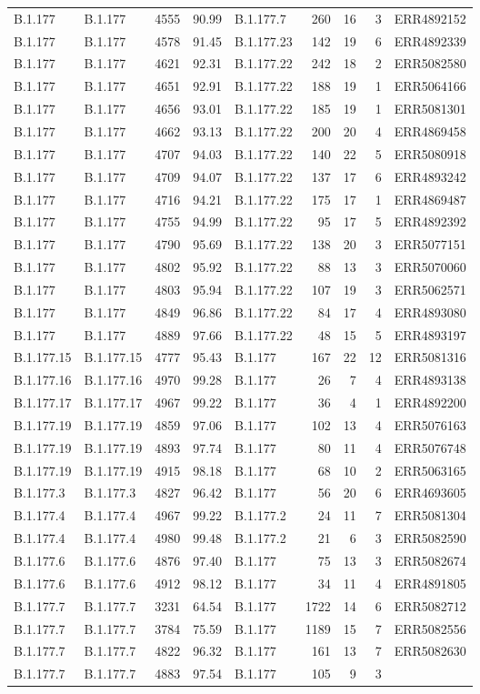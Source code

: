 \documentclass[
]{article}
\begin{document}
\begin{longtable}[]{@{}llrrlrrrl@{}}
B.1.177 & B.1.177 & 4555 & 90.99 & B.1.177.7 & 260 & 16 & 3 &
ERR4892152\tabularnewline
B.1.177 & B.1.177 & 4578 & 91.45 & B.1.177.23 & 142 & 19 & 6 &
ERR4892339\tabularnewline
B.1.177 & B.1.177 & 4621 & 92.31 & B.1.177.22 & 242 & 18 & 2 &
ERR5082580\tabularnewline
B.1.177 & B.1.177 & 4651 & 92.91 & B.1.177.22 & 188 & 19 & 1 &
ERR5064166\tabularnewline
B.1.177 & B.1.177 & 4656 & 93.01 & B.1.177.22 & 185 & 19 & 1 &
ERR5081301\tabularnewline
B.1.177 & B.1.177 & 4662 & 93.13 & B.1.177.22 & 200 & 20 & 4 &
ERR4869458\tabularnewline
B.1.177 & B.1.177 & 4707 & 94.03 & B.1.177.22 & 140 & 22 & 5 &
ERR5080918\tabularnewline
B.1.177 & B.1.177 & 4709 & 94.07 & B.1.177.22 & 137 & 17 & 6 &
ERR4893242\tabularnewline
B.1.177 & B.1.177 & 4716 & 94.21 & B.1.177.22 & 175 & 17 & 1 &
ERR4869487\tabularnewline
B.1.177 & B.1.177 & 4755 & 94.99 & B.1.177.22 & 95 & 17 & 5 &
ERR4892392\tabularnewline
B.1.177 & B.1.177 & 4790 & 95.69 & B.1.177.22 & 138 & 20 & 3 &
ERR5077151\tabularnewline
B.1.177 & B.1.177 & 4802 & 95.92 & B.1.177.22 & 88 & 13 & 3 &
ERR5070060\tabularnewline
B.1.177 & B.1.177 & 4803 & 95.94 & B.1.177.22 & 107 & 19 & 3 &
ERR5062571\tabularnewline
B.1.177 & B.1.177 & 4849 & 96.86 & B.1.177.22 & 84 & 17 & 4 &
ERR4893080\tabularnewline
B.1.177 & B.1.177 & 4889 & 97.66 & B.1.177.22 & 48 & 15 & 5 &
ERR4893197\tabularnewline
B.1.177.15 & B.1.177.15 & 4777 & 95.43 & B.1.177 & 167 & 22 & 12 &
ERR5081316\tabularnewline
B.1.177.16 & B.1.177.16 & 4970 & 99.28 & B.1.177 & 26 & 7 & 4 &
ERR4893138\tabularnewline
B.1.177.17 & B.1.177.17 & 4967 & 99.22 & B.1.177 & 36 & 4 & 1 &
ERR4892200\tabularnewline
B.1.177.19 & B.1.177.19 & 4859 & 97.06 & B.1.177 & 102 & 13 & 4 &
ERR5076163\tabularnewline
B.1.177.19 & B.1.177.19 & 4893 & 97.74 & B.1.177 & 80 & 11 & 4 &
ERR5076748\tabularnewline
B.1.177.19 & B.1.177.19 & 4915 & 98.18 & B.1.177 & 68 & 10 & 2 &
ERR5063165\tabularnewline
B.1.177.3 & B.1.177.3 & 4827 & 96.42 & B.1.177 & 56 & 20 & 6 &
ERR4693605\tabularnewline
B.1.177.4 & B.1.177.4 & 4967 & 99.22 & B.1.177.2 & 24 & 11 & 7 &
ERR5081304\tabularnewline
B.1.177.4 & B.1.177.4 & 4980 & 99.48 & B.1.177.2 & 21 & 6 & 3 &
ERR5082590\tabularnewline
B.1.177.6 & B.1.177.6 & 4876 & 97.40 & B.1.177 & 75 & 13 & 3 &
ERR5082674\tabularnewline
B.1.177.6 & B.1.177.6 & 4912 & 98.12 & B.1.177 & 34 & 11 & 4 &
ERR4891805\tabularnewline
B.1.177.7 & B.1.177.7 & 3231 & 64.54 & B.1.177 & 1722 & 14 & 6 &
ERR5082712\tabularnewline
B.1.177.7 & B.1.177.7 & 3784 & 75.59 & B.1.177 & 1189 & 15 & 7 &
ERR5082556\tabularnewline
B.1.177.7 & B.1.177.7 & 4822 & 96.32 & B.1.177 & 161 & 13 & 7 &
ERR5082630\tabularnewline
B.1.177.7 & B.1.177.7 & 4883 & 97.54 & B.1.177 & 105 & 9 & 3 &

\end{longtable}
\end{document}
